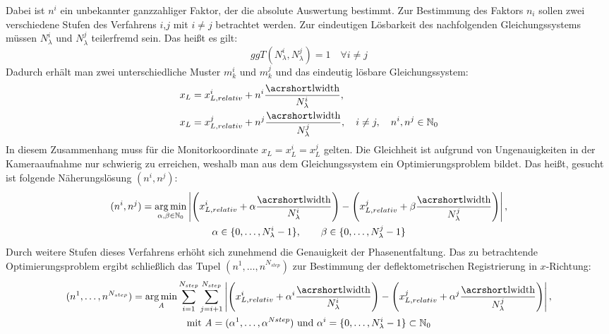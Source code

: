 %
Dabei ist $n^i$ ein unbekannter ganzzahliger Faktor, der die absolute Auswertung bestimmt.
Zur Bestimmung des Faktors $n_i$ sollen zwei verschiedene Stufen des Verfahrens $i$,$j$ mit $i \neq j$ betrachtet werden.
Zur eindeutigen Lösbarkeit des nachfolgenden Gleichungssystems müssen $N_\lambda^i$ und $N_\lambda^j$ teilerfremd sein.
Das heißt es gilt:
%
\begin{equation*}
	ggT(N_\lambda^i, N_\lambda^j) = 1
	\quad
	\forall i \neq j
\end{equation*}
%
Dadurch erhält man zwei unterschiedliche Muster $m_k^i$ und $m_k^j$ und das eindeutig lösbare Gleichungssystem:
%
\begin{equation}\label{eq:gleichungssystemRegistrierung}
	\begin{split}
		x_L & = x_{L,relativ}^i + n^i \dfrac{\acrshortmath{lwidth}}{N_\lambda^i},\\
		x_L & = x_{L,relativ}^j + n^j \dfrac{\acrshortmath{lwidth}}{N_\lambda^j},
		\quad i \neq j,
		\quad n^i, n^j \in \mathbb{N}_0
	\end{split}
\end{equation}
%
In diesem Zusammenhang muss für die Monitorkoordinate $x_L = x_L^i = x_L^j$ gelten.
Die Gleichheit ist aufgrund von Ungenauigkeiten in der Kameraaufnahme nur schwierig zu erreichen, weshalb man aus dem Gleichungssystem ein Optimierungsproblem bildet.
Das heißt, gesucht ist folgende Näherungslösung $(n^i, n^j)$:
%
\begin{equation}\label{eq:optimierungsProblem_zweiStufen}
	\begin{gathered}	
		(n^i, n^j) = \argmin_{\alpha, \beta \in \mathbb{N}_0}
		\left\lvert
			\Bigg(
				x_{L,relativ}^i + \alpha \dfrac{\acrshortmath{lwidth}}{N_\lambda^i}
			\Bigg)
			-
			\Bigg(		
				x_{L,relativ}^j + \beta \dfrac{\acrshortmath{lwidth}}{N_\lambda^j}
			\Bigg)
		\right\rvert,\\
		\alpha \in \lbrace 0,\ldots, N_\lambda^i - 1\rbrace,
		\qquad
		\beta \in \lbrace 0,\ldots, N_\lambda^j - 1\rbrace
	\end{gathered}
\end{equation}
%
Durch weitere Stufen dieses Verfahrens erhöht sich zunehmend die Genauigkeit der Phasenentfaltung.
Das zu betrachtende Optimierungsproblem ergibt schließlich das Tupel $(n^1,\ldots, n^{N_{step}})$ zur Bestimmung der deflektometrischen Registrierung in $x$-Richtung:
%
\begin{equation}\label{eq:optimierungsProblem_mehrstufig}
	\begin{gathered}	
		(n^1,\ldots, n^{N_{step}}) = \argmin_{\mathrm{\textit{A}}}
		\sum\limits_{i = 1}^{N_{step}}
		\sum\limits_{j = i + 1}^{N_{step}}
		\left\lvert
			\Bigg(
				x_{L,relativ}^i + \alpha^i \dfrac{\acrshortmath{lwidth}}{N_\lambda^i}
			\Bigg)
			-
			\Bigg(		
				x_{L,relativ}^j + \alpha^j \dfrac{\acrshortmath{lwidth}}{N_\lambda^j}
			\Bigg)
		\right\rvert,\\
		\text{mit} ~\mathrm{\textit{A}} = (\alpha^1,\ldots,\alpha^{N{step}}) ~\text{und} ~\alpha^i = \lbrace 0,\ldots, N_\lambda^i - 1 \rbrace \subset \mathbb{N}_0
	\end{gathered}
\end{equation}
